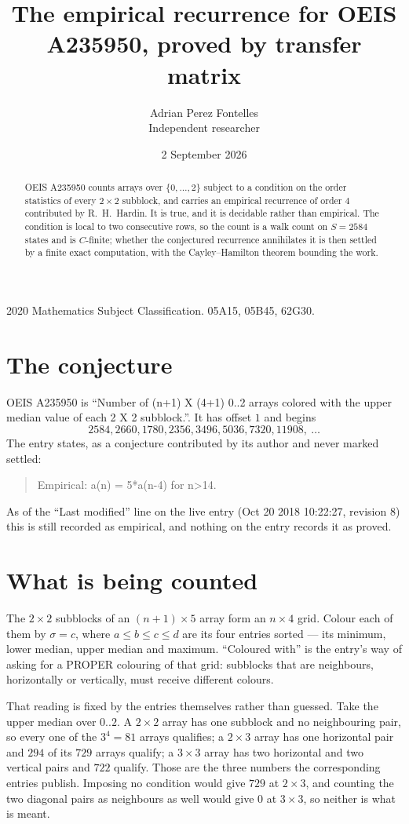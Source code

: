 \documentclass[11pt,a4paper]{article}
\title{The empirical recurrence for OEIS A235950, proved by transfer matrix}
\author{Adrian Perez Fontelles\\ \small Independent researcher}
\date{2 September 2026}
\theoremstyle{plain}
\theoremstyle{definition}
\begin{document}
\maketitle

\begin{abstract}
OEIS A235950 counts arrays over $\{0,\dots,2\}$ subject to a condition on the order
statistics of every $2\times2$ subblock, and carries an empirical recurrence of order
$4$ contributed by R.~H.~Hardin. It is true, and it is decidable rather than empirical.
The condition is local to two consecutive rows, so the count is a walk count on $S=2584$
states and is $C$-finite; whether the conjectured recurrence annihilates it is then settled by
a finite exact computation, with the Cayley--Hamilton theorem bounding the work.
\end{abstract}

\noindent\small 2020 Mathematics Subject Classification. 05A15, 05B45, 62G30.\normalsize

\section{The conjecture}

OEIS A235950 is ``Number of (n+1) X (4+1) 0..2 arrays colored with the upper median value of each 2 X 2 subblock.''. It has offset $1$ and begins
\[
2584, 2660, 1780, 2356, 3496, 5036, 7320, 11908,\ \dots
\]
The entry states, as a conjecture contributed by its author and never marked settled:
\begin{quote}
Empirical: a(n) = 5*a(n-4) for n>14.
\end{quote}
As of the ``Last modified'' line on the live entry (Oct 20 2018 10:22:27, revision 8) this is still
recorded as empirical, and nothing on the entry records it as proved.

\section{What is being counted}

The $2\times2$ subblocks of an $(n+1)\times5$ array form an
$n\times4$ grid. Colour each of them by $\sigma=c$, where $a\le b\le c\le d$ are its four entries sorted --- its minimum, lower median, upper median and maximum. ``Coloured with'' is the entry's way of
asking for a PROPER colouring of that grid: subblocks that are neighbours, horizontally or
vertically, must receive different colours.

That reading is fixed by the entries themselves rather than guessed. Take the upper median
over $0..2$. A $2\times2$ array has one subblock and no neighbouring pair, so every one of the
$3^4=81$ arrays qualifies; a $2\times3$ array has one horizontal pair and $294$ of its $729$
arrays qualify; a $3\times3$ array has two horizontal and two vertical pairs and $722$
qualify. Those are the three numbers the corresponding entries publish. Imposing no condition
would give $729$ at $2\times3$, and counting the two diagonal pairs as neighbours as well
would give $0$ at $3\times3$, so neither is what is meant.
\end{document}
